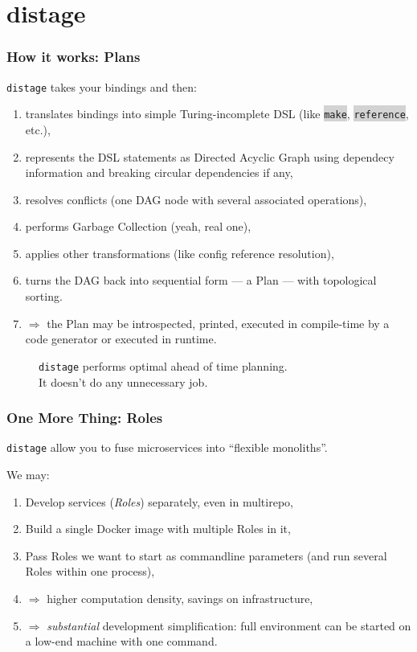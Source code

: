 \documentclass[usenames,dvipsnames]{beamer}
\newcommand{\code}[1]{\colorbox{lightgray}{\texttt{#1}}}
\newcommand{\distage}{\texttt{distage}\xspace}
\begin{document}
\section{distage}
\begin{frame}
  \frametitle{How it works: Plans}
  \distage takes your bindings and then:
  \begin{enumerate}
    \item translates bindings into simple Turing-incomplete DSL (like \code{make}, \code{reference}, etc.),
    \item represents the DSL statements as Directed Acyclic Graph using dependecy information and breaking circular dependencies if any,
    \item resolves conflicts (one DAG node with several associated operations),
    \item performs Garbage Collection (yeah, real one),
    \item applies other transformations (like config reference resolution),
    \item turns the DAG back into sequential form --- a Plan --- with topological sorting.
    \item $\Rightarrow$ the Plan may be introspected, printed, executed in compile-time by a code generator or executed in runtime.
  \end{enumerate}
\end{frame}

\begin{frame}
  \begin{figure}
    \huge \distage performs optimal ahead of time planning.
    \\
    It doesn't  do any unnecessary job.
  \end{figure}
\end{frame}

\begin{frame}
  \frametitle{One More Thing: Roles}
  \distage allow you to fuse microservices into ``flexible monoliths''.

  \vspace{0.3cm}
  We may:
  \begin{enumerate}
  \item Develop services (\textit{Roles}\footnotemark[1]) separately, even in multirepo,
  \item Build a single Docker image with multiple Roles in it,
  \item Pass Roles we want to start as commandline parameters (and run several Roles within one process),
  \item $\Rightarrow$ higher computation density, savings on infrastructure,
  \item $\Rightarrow$ \textit{substantial} development simplification: full environment can be started on a low-end machine with one command.
  \end{enumerate}
\end{frame}
\end{document}
